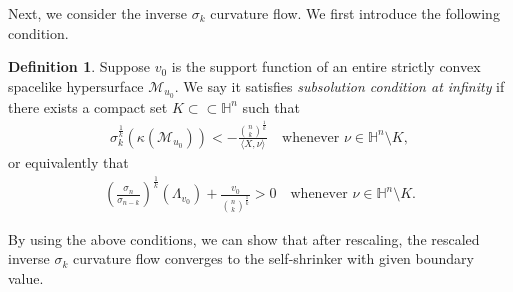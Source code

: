 \documentclass[reqno]{amsart}
\theoremstyle{remark}
\newtheorem{remark}[theorem]{Remark}
\theoremstyle{definition}
\newtheorem{definition}[theorem]{Definition}
\numberwithin{equation}{section}
\begin{document}
 



Next, we consider the inverse $\sigma_k$ curvature flow. We first introduce the following condition. 

\begin{definition}\label{Cond}
Suppose $v_0$ is the support function of an entire strictly convex spacelike hypersurface $\mathcal{M}_{u_0}$. We say it satisfies \emph{subsolution condition at infinity} if there exists a compact set $K \subset \subset \mathbb{H}^n$
such that 
\begin{align}
    \sigma_k^{\frac{1}{k}}\left( \kappa(\mathcal{M}_{u_0}) \right) < - \frac{\binom{n}{k}^{\frac{1}{k}}}{\langle X, \nu \rangle} \quad \text{whenever } 
    \nu \in \mathbb{H}^n \setminus K,
\end{align}
or equivalently that
\begin{align}\label{strict subsolution}
    \left( \frac{\sigma_n}{\sigma_{n-k}} \right)^{\frac{1}{k}}(\Lambda_{v_0}) + \frac{v_0}{\binom{n}{k}^{\frac{1}{k}}} > 0 \quad \text{whenever } 
    \nu \in \mathbb{H}^n \setminus K.
\end{align}
\end{definition}



By using the above conditions, we can show that after rescaling, the rescaled inverse $\sigma_k$ curvature flow converges to the self-shrinker with given boundary value. 
\end{document}
